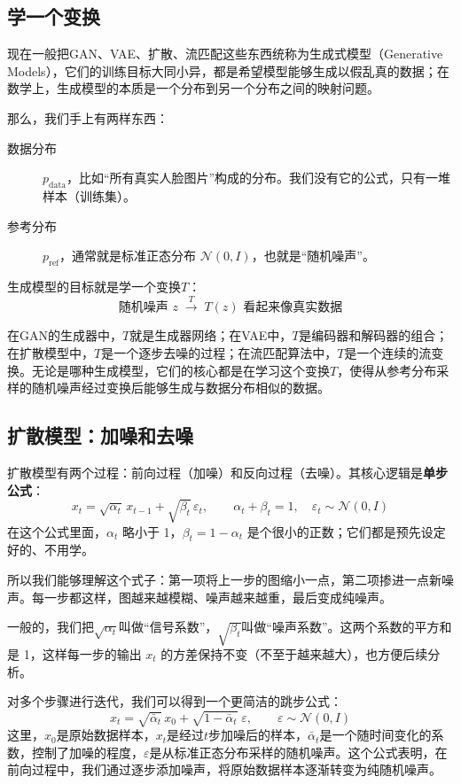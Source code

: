 \subsection{学一个变换}

现在一般把GAN、VAE、扩散、流匹配这些东西统称为生成式模型（Generative Models），它们的训练目标大同小异，都是希望模型能够生成以假乱真的数据；在数学上，生成模型的本质是一个分布到另一个分布之间的映射问题。

那么，我们手上有两样东西：
\begin{description}
    \item [数据分布] $p_{\text{data}}$，比如“所有真实人脸图片”构成的分布。我们没有它的公式，只有一堆样本（训练集）。
    \item [参考分布] $p_{\text{ref}}$，通常就是标准正态分布 $\mathcal{N}(0, I)$，也就是“随机噪声”。
\end{description}
生成模型的目标就是学一个变换$T$：
\[
\text{随机噪声 } z \;\xrightarrow{\;T\;}\; T(z) \text{ 看起来像真实数据}
\]

在GAN的生成器中，$T$就是生成器网络；在VAE中，$T$是编码器和解码器的组合；在扩散模型中，$T$是一个逐步去噪的过程；在流匹配算法中，$T$是一个连续的流变换。无论是哪种生成模型，它们的核心都是在学习这个变换$T$，使得从参考分布采样的随机噪声经过变换后能够生成与数据分布相似的数据。

\subsection{扩散模型：加噪和去噪}

扩散模型有两个过程：前向过程（加噪）和反向过程（去噪）。其核心逻辑是\textbf{单步公式}：
\begin{equation}\label{eq:forward}
x_t = \sqrt{\alpha_t}\,x_{t-1} + \sqrt{\beta_t}\,\varepsilon_t, \qquad \alpha_t + \beta_t = 1,\quad \varepsilon_t \sim \mathcal{N}(0, I)
\end{equation}
在这个公式里面，$\alpha_t$ 略小于 1，$\beta_t = 1-\alpha_t$ 是个很小的正数；它们都是预先设定好的、不用学。

所以我们能够理解这个式子：第一项将上一步的图缩小一点，第二项掺进一点新噪声。每一步都这样，图越来越模糊、噪声越来越重，最后变成纯噪声。

一般的，我们把$\sqrt{\alpha_t}$叫做“信号系数”，$\sqrt{\beta_t}$叫做“噪声系数”。这两个系数的平方和是 1，这样每一步的输出 $x_t$ 的方差保持不变（不至于越来越大），也方便后续分析。

对多个步骤进行迭代，我们可以得到一个更简洁的跳步公式：
\begin{equation}\label{eq:jump}
\boxed{\; x_t = \sqrt{\bar\alpha_t}\,x_0 + \sqrt{1-\bar\alpha_t}\;\varepsilon, \qquad \varepsilon \sim \mathcal{N}(0, I) \;}
\end{equation}
这里，$x_0$是原始数据样本，$x_t$是经过$t$步加噪后的样本，$\bar\alpha_t$是一个随时间变化的系数，控制了加噪的程度，$\varepsilon$是从标准正态分布采样的随机噪声。这个公式表明，在前向过程中，我们通过逐步添加噪声，将原始数据样本逐渐转变为纯随机噪声。

